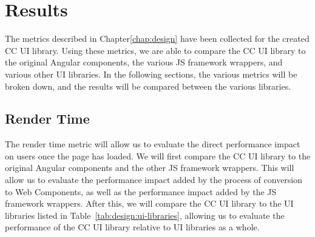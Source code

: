 \chapter{Results}\label{chap:results}
The metrics described in Chapter\ref{chap:design} have been collected for the created CC UI library. Using these metrics, we are able to compare the CC UI library to the original Angular components, the various JS framework wrappers, and various other UI libraries. In the following sections, the various metrics will be broken down, and the results will be compared between the various libraries.

\section{Render Time}
The render time metric will allow us to evaluate the direct performance impact on users once the page has loaded. We will first compare the CC UI library to the original Angular components and the other JS framework wrappers. This will allow us to evaluate the performance impact added by the process of conversion to Web Components, as well as the performance impact added by the JS framework wrappers. After this, we will compare the CC UI library to the UI libraries listed in Table~\ref{tab:design:ui-libraries}, allowing us to evaluate the performance of the CC UI library relative to UI libraries as a whole.

